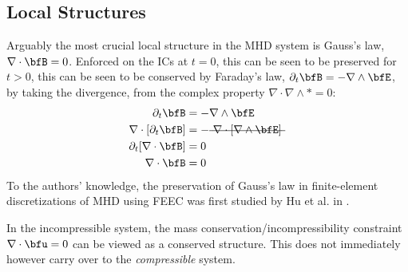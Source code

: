 \subsection*{Local Structures}
    Arguably the most crucial local structure in the MHD system is Gauss's law, $\nabla\cdot\bfB  =  0$. Enforced on the ICs at $t  =  0$, this can be seen to be preserved for $t  >  0$, this can be seen to be conserved by Faraday's law, $\partial_{t}\bfB  =  - \nabla\wedge\bfE$, by taking the divergence, from the complex property $\nabla\cdot\nabla\wedge*  =  0$: \cite{Stratton_1941, Rosen_1980, Freistühler_Warnecke_2002}
    \begin{align}
                    \partial_{t}\bfB   &=  - \nabla\wedge\bfE  \\
        \nabla\cdot[\partial_{t}\bfB]  &=  - \mst{\nabla\cdot[\nabla\wedge\bfE]}  \\
        \partial_{t}[\nabla\cdot\bfB]  &=  0  \\
                     \nabla\cdot\bfB   &=  0
    \end{align}
    To the authors' knowledge, the preservation of Gauss's law in finite-element discretizations of MHD using FEEC was first studied by Hu et al. in \cite{Hu_Xu_2015, Hu_Ma_Xu_2017}.

    \begin{remark}
        In the incompressible system, the mass conservation/incompressibility constraint $\nabla\cdot\bfu  =  0$ can be viewed as a conserved structure. This does not immediately however carry over to the \emph{compressible} system.
    \end{remark}
